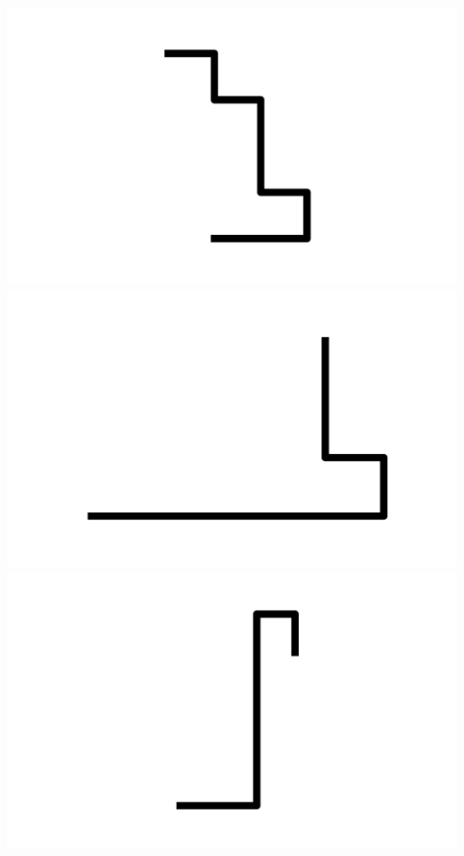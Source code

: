 \documentclass[]{report}
\begin{document}
\includegraphics[scale=.1]{pictures/21/state_cluster_shapes_262.pdf} 
\includegraphics[scale=.1]{pictures/21/state_cluster_shapes_263.pdf} 
\includegraphics[scale=.1]{pictures/21/state_cluster_shapes_264.pdf} 
\end{document}
